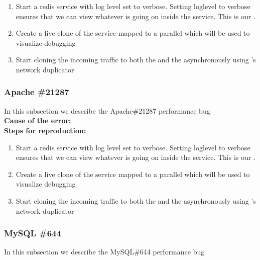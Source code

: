 \begin{adjustwidth}{0.5cm}{}
	\begin{enumerate}
		\item Start a redis service with log level set to verbose. Setting loglevel to verbose ensures that we can view whatever is going on inside the service. This is our \productioncontainer.
		\item Create a live clone of the service mapped to a parallel \debugcontainer which will be used to visualize debugging
		\item Start cloning the incoming traffic to both the \productioncontainer and the \debugcontainer asynchronously using \parikshan's network duplicator
	\end{enumerate}
\end{adjustwidth}


\subsubsection{Apache \#21287}

In this subsection we describe the Apache\#21287 performance bug \\

\noindent \textbf{Cause of the error:} \\

\noindent \textbf{Steps for reproduction:} \\

\begin{adjustwidth}{0.5cm}{}
	\begin{enumerate}
		\item Start a redis service with log level set to verbose. Setting loglevel to verbose ensures that we can view whatever is going on inside the service. This is our \productioncontainer.
		\item Create a live clone of the service mapped to a parallel \debugcontainer which will be used to visualize debugging
		\item Start cloning the incoming traffic to both the \productioncontainer and the \debugcontainer asynchronously using \parikshan's network duplicator
	\end{enumerate}
\end{adjustwidth}


\subsubsection{MySQL \#644}

In this subsection we describe the MySQL\#644 performance bug \\

